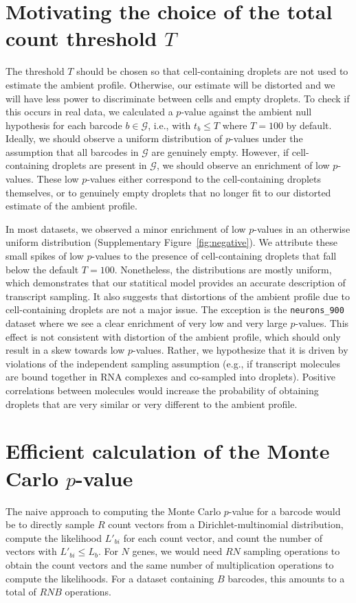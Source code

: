 \documentclass{article}
\newcommand{\code}[1]{\texttt{#1}}
\begin{document}
\section{Motivating the choice of the total count threshold $T$}
The threshold $T$ should be chosen so that cell-containing droplets are not used to estimate the ambient profile.
Otherwise, our estimate will be distorted and we will have less power to discriminate between cells and empty droplets.
To check if this occurs in real data, we calculated a $p$-value against the ambient null hypothesis for each barcode $b \in \mathcal{G}$, 
i.e., with $t_b \le T$ where $T = 100$ by default.
Ideally, we should observe a uniform distribution of $p$-values under the assumption that all barcodes in $\mathcal{G}$ are genuinely empty.
However, if cell-containing droplets are present in $\mathcal{G}$, we should observe an enrichment of low $p$-values.
These low $p$-values either correspond to the cell-containing droplets themselves,
or to genuinely empty droplets that no longer fit to our distorted estimate of the ambient profile.

In most datasets, we observed a minor enrichment of low $p$-values in an otherwise uniform distribution (Supplementary Figure~\ref{fig:negative}). 
We attribute these small spikes of low $p$-values to the presence of cell-containing droplets that fall below the default $T=100$.
Nonetheless, the distributions are mostly uniform, which demonstrates that our statitical model provides an accurate description of transcript sampling.
It also suggests that distortions of the ambient profile due to cell-containing droplets are not a major issue.
The exception is the \code{neurons\_900} dataset where we see a clear enrichment of very low and very large $p$-values.
This effect is not consistent with distortion of the ambient profile, which should only result in a skew towards low $p$-values.
Rather, we hypothesize that it is driven by violations of the independent sampling assumption (e.g., if transcript molecules are bound together in RNA complexes and co-sampled into droplets).
Positive correlations between molecules would increase the probability of obtaining droplets that are very similar or very different to the ambient profile.

\section{Efficient calculation of the Monte Carlo $p$-value}
The naive approach to computing the Monte Carlo $p$-value for a barcode would be to directly sample $R$ count vectors from a Dirichlet-multinomial distribution,
compute the likelihood $L'_{bi}$ for each count vector, and count the number of vectors with $L'_{bi} \le L_{b}$.
For $N$ genes, we would need $RN$ sampling operations to obtain the count vectors and the same number of multiplication operations to compute the likelihoods.
For a dataset containing $B$ barcodes, this amounts to a total of $RNB$ operations.
\end{document}
